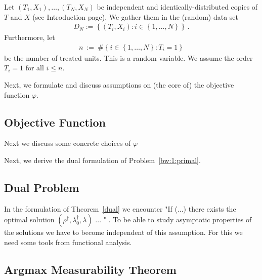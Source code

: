 Let $(T_1,X_1),\ldots,(T_N,X_N)$ be independent and identically-distributed copies of $T$ and $X$ (see Introduction page). 
We gather them in the (random) data set 
\begin{gather*}
D_N:=\left\{ (T_i,X_i)\colon i\in \left\{ 1,\ldots,N \right\} \right\}
\,.
\end{gather*}
Furthermore, let
\begin{gather*}
  n
  \ 
  :=
  \ 
  \# 
  \left\{ 
    i\in \left\{ 1,\ldots,N \right\}
    \colon
    T_i=1
  \right\}
\end{gather*}
be the number of treated units. This is a random variable. We assume the order $T_i=1$ for all $i\le n$.



Next, we formulate and discuss assumptions on (the core of) the objective function $\varphi$.
\subsection{Objective Function}


Next we discuss some concrete choices of $\varphi$




Next, we derive the dual formulation of Problem~\ref{bw:1:primal}.
\subsection{Dual Problem}



In the formulation of Theorem~\ref{dual} we encounter "If (...) there exists the optimal solution $(\rho^\dagger,\lambda_0^\dagger,\lambda)$ ... " .
To be able to study asymptotic properties of the solutions we have to become independent of this assumption.
For this we need some tools from functional analysis.
\subsection{Argmax Measurability Theorem}


